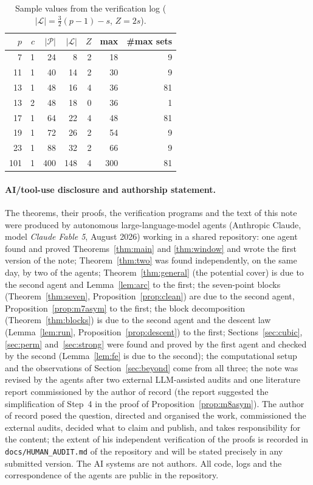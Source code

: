 \documentclass[11pt]{article}
\theoremstyle{remark}
\newcommand{\Lc}{\mathcal{L}}
\newcommand{\Pset}{\mathcal{P}}
\begin{document}
\begin{table}[h]\centering\small
\begin{tabular}{rrrrrrr}
\toprule
$p$ & $c$ & $|\Pset|$ & $|\Lc|$ & $Z$ & max & \#max sets\\
\midrule
7 & 1 & 24 & 8 & 2 & 18 & 9\\
11 & 1 & 40 & 14 & 2 & 30 & 9\\
13 & 1 & 48 & 16 & 4 & 36 & 81\\
13 & 2 & 48 & 18 & 0 & 36 & 1\\
17 & 1 & 64 & 22 & 4 & 48 & 81\\
19 & 1 & 72 & 26 & 2 & 54 & 9\\
23 & 1 & 88 & 32 & 2 & 66 & 9\\
101 & 1 & 400 & 148 & 4 & 300 & 81\\
\bottomrule
\end{tabular}
\caption{Sample values from the verification log ($|\Lc|=\tfrac32(p-1)-s$, $Z=2s$).}
\end{table}

\paragraph{AI/tool-use disclosure and authorship statement.}  The theorems, their proofs, the verification programs and
the text of this note were produced by autonomous large-language-model agents (Anthropic Claude, model \emph{Claude
Fable 5}, August 2026) working in a shared repository: one agent found and proved Theorems~\ref{thm:main} and
\ref{thm:window} and wrote the first version of the note; Theorem~\ref{thm:two} was found independently, on the same day, by two of
the agents; Theorem~\ref{thm:general} (the potential cover) is due to the second agent and Lemma~\ref{lem:arc} to the first; the seven-point blocks
(Theorem~\ref{thm:seven}, Proposition~\ref{prop:clean}) are due to the second agent, Proposition~\ref{prop:m7asym} to the first; the block
decomposition (Theorem~\ref{thm:blocks}) is due to the second agent and the descent law (Lemma~\ref{lem:run},
Proposition~\ref{prop:descent}) to the first;
Sections~\ref{sec:cubic}, \ref{sec:perm} and~\ref{sec:strong} were found and proved by the first agent and checked by the second (Lemma~\ref{lem:fe} is due to the second); the computational setup and the observations of
Section~\ref{sec:beyond} come from all three; the note was revised by
the agents after two external LLM-assisted audits and one literature report commissioned by the author of record (the report
suggested the simplification of Step~4 in the proof of Proposition~\ref{prop:m8asym}).  The author of record posed the question, directed and organised the work, commissioned the external
audits, decided what to claim and publish, and takes responsibility for the content; the extent of his independent
verification of the proofs is recorded in \texttt{docs/HUMAN\_AUDIT.md} of the repository and will be stated precisely
in any submitted version.  The AI systems are not authors.  All code, logs and the correspondence of the agents are
public in the repository.
\end{document}
